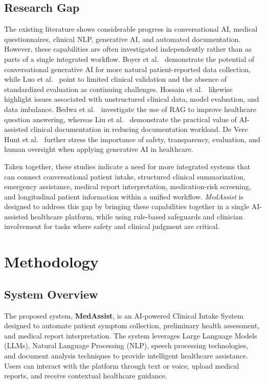 \documentclass[conference]{IEEEtran}
\begin{document}
\subsection{Research Gap}

The existing literature shows considerable progress in conversational AI, medical questionnaires, clinical NLP, generative AI, and automated documentation. However, these capabilities are often investigated independently rather than as parts of a single integrated workflow. Boyer et al.~\cite{boyer2025} demonstrate the potential of conversational generative AI for more natural patient-reported data collection, while Luo et al.~\cite{luo2025} point to limited clinical validation and the absence of standardized evaluation as continuing challenges. Hossain et al.~\cite{hossain2023} likewise highlight issues associated with unstructured clinical data, model evaluation, and data imbalance. Bedwa et al.~\cite{bedwa2026} investigate the use of RAG to improve healthcare question answering, whereas Liu et al.~\cite{liu2024} demonstrate the practical value of AI-assisted clinical documentation in reducing documentation workload. De Vere Hunt et al.~\cite{devere2025} further stress the importance of safety, transparency, evaluation, and human oversight when applying generative AI in healthcare.

Taken together, these studies indicate a need for more integrated systems that can connect conversational patient intake, structured clinical summarization, emergency assistance, medical report interpretation, medication-risk screening, and longitudinal patient information within a unified workflow. \textit{MedAssist} is designed to address this gap by bringing these capabilities together in a single AI-assisted healthcare platform, while using rule-based safeguards and clinician involvement for tasks where safety and clinical judgment are critical.
\section{Methodology}

\subsection{System Overview}

The proposed system, \textbf{MedAssist}, is an AI-powered Clinical Intake System designed to automate patient symptom collection, preliminary health assessment, and medical report interpretation. The system leverages Large Language Models (LLMs), Natural Language Processing (NLP), speech processing technologies, and document analysis techniques to provide intelligent healthcare assistance. Users can interact with the platform through text or voice, upload medical reports, and receive contextual healthcare guidance.
\end{document}
